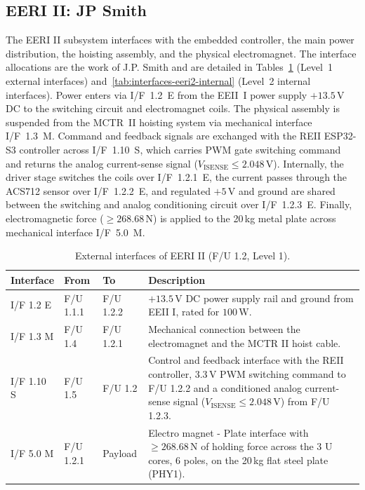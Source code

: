 \subsection{EERI II: JP Smith}
\label{subsec:eeri2-interfaces}
The EERI II subsystem interfaces with the embedded controller, the main power distribution, the hoisting assembly, and the physical electromagnet.
The interface allocations are the work of J.P. Smith and are detailed in Tables~\ref{tab:interfaces-eeri2} (Level~1 external interfaces) and~\ref{tab:interfaces-eeri2-internal} (Level~2 internal interfaces).
Power enters via I/F~1.2~E from the EEII~I power supply $+13.5\,\text{V}$ DC to the switching circuit and electromagnet coils.
The physical assembly is suspended from the MCTR~II hoisting system via mechanical interface I/F~1.3~M.
Command and feedback signals are exchanged with the REII ESP32-S3 controller across I/F~1.10~S, which carries PWM gate switching command and returns the analog current-sense signal ($V_{\mathrm{ISENSE}} \le 2.048\,\text{V}$).
Internally, the driver stage switches the coils over I/F~1.2.1~E,
the current passes through the ACS712 sensor over I/F~1.2.2~E,
and regulated $+5\,\text{V}$ and ground are shared between the switching and analog conditioning circuit over I/F~1.2.3~E.
Finally, electromagnetic force ($\ge 268.68\,\text{N}$) is applied to the 20\,kg metal plate across mechanical interface I/F~5.0~M.
\begin{table}[H]
    \centering
    \caption{External interfaces of EERI II (F/U 1.2, Level 1).}
    \label{tab:interfaces-eeri2}
    \begin{tabularx}{\textwidth}{@{} l l l X @{}}
        \toprule
        \textbf{Interface} & \textbf{From} & \textbf{To} & \textbf{Description} \\
        \midrule
        I/F 1.2 E  & F/U 1.1.1 & F/U 1.2.2 & $+13.5\,\text{V}$ DC power supply rail and ground from EEII I, rated for $100\,\text{W}$. \\
        I/F 1.3 M  & F/U 1.4   & F/U 1.2.1 & Mechanical connection between the electromagnet and the MCTR II hoist cable. \\
        I/F 1.10 S & F/U 1.5   & F/U 1.2   & Control and feedback interface with the REII controller, 3.3\,V PWM switching command to F/U 1.2.2 and a conditioned analog current-sense signal ($V_{\mathrm{ISENSE}} \le 2.048\,\text{V}$) from F/U 1.2.3. \\
        I/F 5.0 M  & F/U 1.2.1 & Payload   & Electro magnet - Plate interface with $\ge 268.68\,\text{N}$ of holding force across the 3 U cores, 6 poles, on the 20\,kg flat steel plate (PHY1). \\
        \bottomrule
    \end{tabularx}
\end{table}

